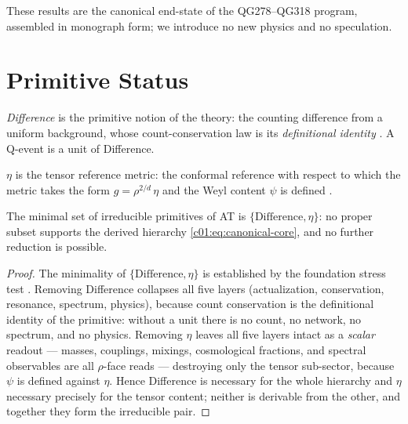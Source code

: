 These results are the canonical end-state of the QG278--QG318 program, assembled in monograph
form; we introduce no new physics and no speculation.

\section{Primitive Status}
\label{c01:sec:primitive-status}

\begin{definition}[Difference]
\label{c01:def:difference}
\emph{Difference} is the primitive notion of the theory: the counting difference from a
uniform background, whose count-conservation law is its \emph{definitional identity}
\cite{c01:QG268}. A Q-event is a unit of Difference.
\end{definition}

\begin{definition}
\label{c01:def:eta}
\emph{$\eta$} is the tensor reference metric: the conformal reference with respect to which
the metric takes the form $g = \rho^{2/d}\,\eta$ and the Weyl content $\psi$ is defined
\cite{c01:QG286}.
\end{definition}

\begin{theorem}
\label{c01:thm:minimal-primitives}
The minimal set of irreducible primitives of AT is $\{\text{Difference},\eta\}$: no proper
subset supports the derived hierarchy \eqref{c01:eq:canonical-core}, and no further
reduction is possible.
\end{theorem}

\begin{proof}
The minimality of $\{\text{Difference},\eta\}$ is established by the foundation stress test
\cite{c01:QG292}. Removing Difference collapses all five layers (actualization, conservation,
resonance, spectrum, physics), because count conservation is the definitional identity of the
primitive: without a unit there is no count, no network, no spectrum, and no physics.
Removing $\eta$ leaves all five layers intact as a \emph{scalar} readout --- masses,
couplings, mixings, cosmological fractions, and spectral observables are all $\rho$-face
reads --- destroying only the tensor sub-sector, because $\psi$ is defined against $\eta$.
Hence Difference is necessary for the whole hierarchy and $\eta$ necessary precisely for the
tensor content; neither is derivable from the other, and together they form the irreducible
pair.
\end{proof}

